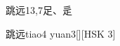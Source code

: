 \begin{entry}{跳远}{13,7}{⾜、⾡}
  \begin{phonetics}{跳远}{tiao4 yuan3}[][HSK 3]
  \end{phonetics}
\end{entry}
